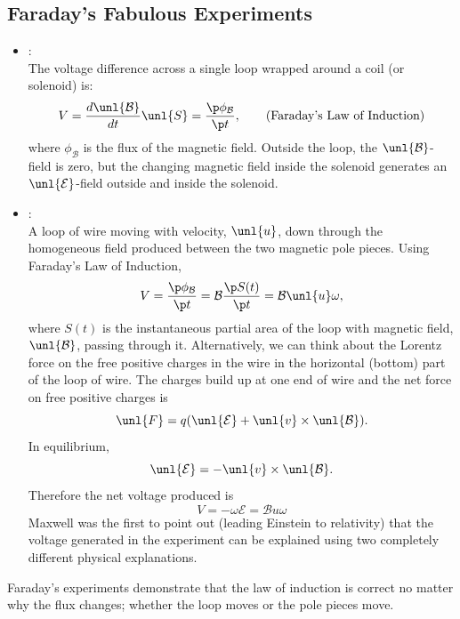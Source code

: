\documentclass[a4paper, 11pt, normalem]{report}
\renewcommand\E{\mathcal{E}}
\newcommand\uE{\unl{\E}}
\renewcommand\B{\mathcal{B}}
\newcommand\uB{\unl{\B}}
\begin{document}
\subsection{Faraday's Fabulous Experiments}
\begin{itemize}
    \item {}: \\
    The voltage difference across a single loop wrapped around a coil (or solenoid) is:
    \begin{equation}
        V = \frac{d\uB}{dt}\unl{S} = \frac{\p \phi_{\B}}{\p t}, \tag{Faraday's Law of Induction}
    \end{equation}
    where $\phi_\B$ is the flux of the magnetic field.
    Outside the loop, the $\uB$-field is zero, but the changing magnetic field inside the solenoid generates an $\uE$-field outside and inside the solenoid.
    \item {}: \\
    A loop of wire moving with velocity, $\unl{u}$, down through the homogeneous field produced between the two magnetic pole pieces.
    Using Faraday's Law of Induction,
    \begin{equation}
        V = \frac{\p \phi_{\B}}{\p t} = \B\frac{\p S(t)}{\p t} = \B\unl{u}\omega,
    \end{equation}
    where $S(t)$ is the instantaneous partial area of the loop with magnetic field, $\uB$, passing through it.
    Alternatively, we can think about the Lorentz force on the free positive charges in the wire in the horizontal (bottom) part of the loop of wire.
    The charges build up at one end of wire and the net force on free positive charges is
    \begin{equation}
        \unl{F} = q(\uE + \unl{v}\times\uB).
    \end{equation}
    In equilibrium,
    \begin{equation}
        \uE = -\unl{v}\times\uB.
    \end{equation}
    Therefore the net voltage produced is
    \begin{equation}
        V = -\omega \E = \B u \omega
    \end{equation}
    Maxwell was the first to point out (leading Einstein to relativity) that the voltage generated in the experiment can be explained using two completely different physical explanations.
\end{itemize}
Faraday's experiments demonstrate that the law of induction is correct no matter why the flux changes; whether the loop moves or the pole pieces move.
\end{document}
